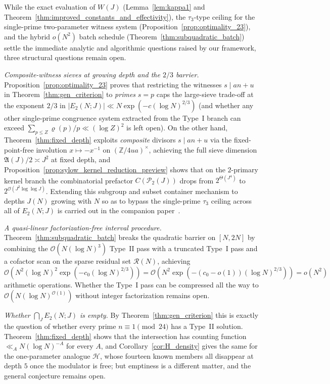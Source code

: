 \documentclass[11pt, a4paper]{article}
\theoremstyle{plain}
\theoremstyle{definition}
\newcommand{\Z}{\mathbb{Z}}
\begin{document}
While the exact evaluation of $W(J)$ (Lemma~\ref{lem:kappa1} and Theorem~\ref{thm:improved_constants_and_effectivity}), the $\tau_3$-type ceiling for the single-prime two-parameter witness system (Proposition~\ref{prop:optimality_23}), and the hybrid $o(N^{2})$ batch schedule (Theorem~\ref{thm:subquadratic_batch}) settle the immediate analytic and algorithmic questions raised by our framework, three structural questions remain open.

\emph{Composite-witness sieves at growing depth and the $2/3$ barrier.} Proposition~\ref{prop:optimality_23} proves that restricting the witnesses $s\mid an+u$ in Theorem~\ref{thm:gen_criterion} to \emph{primes} $s=p$ caps the large-sieve trade-off at the exponent $2/3$ in $|E_2(N;J)|\ll N\exp(-c(\log N)^{2/3})$ (and whether any other single-prime congruence system extracted from the Type~I branch can exceed $\sum_{p\le Z}\varrho(p)/p\ll(\log Z)^{2}$ is left open). On the other hand, Theorem~\ref{thm:fixed_depth} exploits \emph{composite} divisors $s\mid an+u$ via the fixed-point-free involution $x\mapsto-x^{-1}$ on $(\Z/4ua)^{\times}$, achieving the full sieve dimension $\mathfrak{A}(J)/2\asymp J^{2}$ at fixed depth, and Proposition~\ref{prop:sylow_kernel_reduction_preview} shows that on the $2$-primary kernel branch the combinatorial prefactor $C(\mathcal{P}_2(J))$ drops from $2^{\Theta(J^{4})}$ to $2^{\mathcal{O}(J^{2}\log\log J)}$. Extending this subgroup and subset container mechanism to depths $J(N)$ growing with $N$ so as to bypass the single-prime $\tau_3$ ceiling across all of $E_2(N;J)$ is carried out in the companion paper~\cite{dahan2026b}.

\emph{A quasi-linear factorization-free interval procedure.} Theorem~\ref{thm:subquadratic_batch} breaks the quadratic barrier on $[N,2N]$ by combining the $\mathcal{O}(N(\log N)^{3})$ Type~II pass with a truncated Type~I pass and a cofactor scan on the sparse residual set $\mathcal{R}(N)$, achieving $\mathcal{O}(N^{2}(\log N)^{2}\exp(-c_0(\log N)^{2/3}))=\mathcal{O}(N^{2}\exp(-(c_0-o(1))(\log N)^{2/3}))=o(N^{2})$ arithmetic operations. Whether the Type~I pass can be compressed all the way to $\mathcal{O}(N(\log N)^{\mathcal{O}(1)})$ without integer factorization remains open.

\emph{Whether $\bigcap_J E_2(N;J)$ is empty.} By Theorem~\ref{thm:gen_criterion} this is exactly the question of whether every prime $n\equiv1\pmod{24}$ has a Type~II solution. Theorem~\ref{thm:fixed_depth} shows that the intersection has counting function $\ll_A N(\log N)^{-A}$ for every $A$, and Corollary~\ref{cor:H_density} gives the same for the one-parameter analogue $\mathcal{H}$, whose fourteen known members all disappear at depth $5$ once the modulator is free; but emptiness is a different matter, and the general conjecture remains open.
\end{document}
